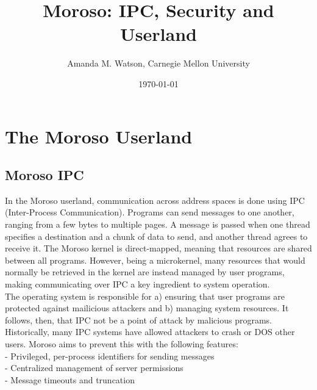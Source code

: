 \documentclass{article}
\title{Moroso: IPC, Security and Userland} %
\author{Amanda M. Watson, Carnegie Mellon University}
\date{\today} %
\begin{document}
\maketitle %






\section{The Moroso Userland}
\subsection{Moroso IPC}
In the Moroso userland, communication across address spaces is done using IPC (Inter-Process Communication).  Programs can send messages to one another, ranging from a few bytes to multiple pages.  A message is passed when one thread specifies a destination and a chunk of data to send, and another thread agrees to receive it.  The Moroso kernel is direct-mapped, meaning that resources are shared between all programs.  However, being a microkernel, many resources that would normally be retrieved in the kernel are instead managed by user programs, making communicating over IPC a key ingredient to system operation.  \\

The operating system is responsible for a) ensuring that user programs are protected against mailicious attackers and b) managing system resources.  It follows, then, that IPC not be a point of attack by malicious programs.  Historically, many IPC systems have allowed attackers to crash or DOS other users.  Moroso aims to prevent this with the following features: \\

- Privileged, per-process identifiers for sending messages\\
- Centralized management of server permissions\\
- Message timeouts and truncation
\end{document}
